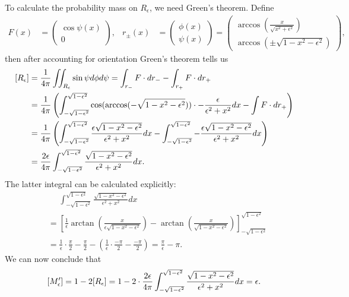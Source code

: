 \documentclass[twoside,a4paper]{article}
\theoremstyle{plain}
\theoremstyle{definition}
\theoremstyle{remark}
\numberwithin{equation}{section}
\let\P\relax
\DeclareMathOperator{\P}{\mathbb{P}}
\DeclareMathOperator{\1}{\mathbbm{1}}
\begin{document}
To calculate the probability mass on $R_\epsilon$, we need Green's theorem. Define 
\begin{align*}
F(x)&=\begin{pmatrix}
\cos \psi(x)\\
0
\end{pmatrix},&r_{\pm}(x)&=\begin{pmatrix}\phi(x)\\\psi(x)\end{pmatrix}=\begin{pmatrix}\arccos\left(\frac{x}{\sqrt{x^2+\epsilon^2}}\right)\\
\arccos\left(\pm\sqrt{1-x^2-\epsilon^2}\right)
\end{pmatrix},
\end{align*}
then after accounting for orientation Green's theorem tells us
\begin{align*}
\P[R_\epsilon]&=\frac{1}{4\pi}\iint_{R_\epsilon}\sin\psi d\phi d\psi=\int_{r_-} F\cdot dr_- - \int_{r_+} F\cdot dr_+\\
&=\frac{1}{4\pi}\left(\int_{-\sqrt{1-\epsilon^2}}^{\sqrt{1-\epsilon^2}}\cos(\arccos(-\sqrt{1-x^2-\epsilon^2}))\cdot-\frac{\epsilon}{\epsilon^2+x^2}dx- \int F\cdot dr_+\right)\\
&=\frac{1}{4\pi}\left(\int_{-\sqrt{1-\epsilon^2}}^{\sqrt{1-\epsilon^2}}\frac{\epsilon\sqrt{1-x^2-\epsilon^2}}{\epsilon^2+x^2}dx- \int_{-\sqrt{1-\epsilon^2}}^{\sqrt{1-\epsilon^2}}-\frac{\epsilon\sqrt{1-x^2-\epsilon^2}}{\epsilon^2+x^2}dx\right)\\
&=\frac{2\epsilon}{4\pi}\int_{-\sqrt{1-\epsilon^2}}^{\sqrt{1-\epsilon^2}}\frac{\sqrt{1-x^2-\epsilon^2}}{\epsilon^2+x^2}dx.
\end{align*}
The latter integral can be calculated explicitly:
\begin{align*}
&\phantom{=}\int_{-\sqrt{1-\epsilon^2}}^{\sqrt{1-\epsilon^2}}\frac{\sqrt{1-x^2-\epsilon^2}}{\epsilon^2+x^2}dx\\
&=\left[\frac{1}{\epsilon}\arctan\left(\frac{x}{\epsilon\sqrt{1-x^2-\epsilon^2}}\right)-\arctan\left(\frac{x}{\sqrt{1-x^2-\epsilon^2}}\right)\right]_{-\sqrt{1-\epsilon^2}}^{\sqrt{1-\epsilon^2}}\\
&=\frac{1}{\epsilon}\cdot\frac{\pi}{2}-\frac{\pi}{2}-\left(\frac{1}{\epsilon}\cdot\frac{-\pi}{2}-\frac{-\pi}{2}\right)=\frac{\pi}{\epsilon}-\pi.
\end{align*}
We can now conclude that
\[\P[M'_\epsilon]=1-2\P[R_\epsilon]=1-2\cdot\frac{2\epsilon}{4\pi}\int_{-\sqrt{1-\epsilon^2}}^{\sqrt{1-\epsilon^2}}\frac{\sqrt{1-x^2-\epsilon^2}}{\epsilon^2+x^2}dx=\epsilon.\]
\end{document}
